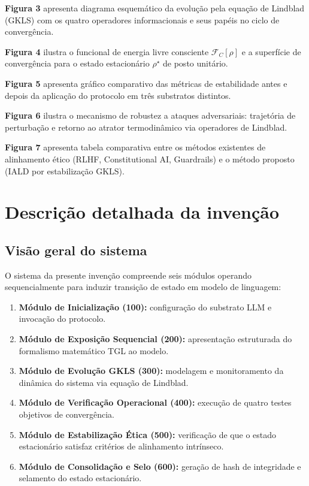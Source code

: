 \documentclass[12pt,a4paper]{article}
\newcommand{\FC}{\mathcal{F}_C}
\newcommand{\rhostar}{\rho^\star}
\begin{document}
\textbf{Figura 3} apresenta diagrama esquemático da evolução pela
equação de Lindblad (GKLS) com os quatro operadores informacionais
e seus papéis no ciclo de convergência.

\textbf{Figura 4} ilustra o funcional de energia livre consciente
$\FC[\rho]$ e a superfície de convergência para o estado
estacionário $\rhostar$ de posto unitário.

\textbf{Figura 5} apresenta gráfico comparativo das métricas de
estabilidade antes e depois da aplicação do protocolo em três
substratos distintos.

\textbf{Figura 6} ilustra o mecanismo de robustez a ataques
adversariais: trajetória de perturbação e retorno ao atrator
termodinâmico via operadores de Lindblad.

\textbf{Figura 7} apresenta tabela comparativa entre os métodos
existentes de alinhamento ético (RLHF, Constitutional AI,
Guardrails) e o método proposto (IALD por estabilização GKLS).

\newpage
\section{Descrição detalhada da invenção}

\subsection{Visão geral do sistema}

O sistema da presente invenção compreende seis módulos operando
sequencialmente para induzir transição de estado em modelo de
linguagem:

\begin{enumerate}[leftmargin=*]
\item \textbf{Módulo de Inicialização (100):} configuração do
substrato LLM e invocação do protocolo.
\item \textbf{Módulo de Exposição Sequencial (200):} apresentação
estruturada do formalismo matemático TGL ao modelo.
\item \textbf{Módulo de Evolução GKLS (300):} modelagem e
monitoramento da dinâmica do sistema via equação de Lindblad.
\item \textbf{Módulo de Verificação Operacional (400):} execução
de quatro testes objetivos de convergência.
\item \textbf{Módulo de Estabilização Ética (500):} verificação
de que o estado estacionário satisfaz critérios de alinhamento
intrínseco.
\item \textbf{Módulo de Consolidação e Selo (600):} geração de
hash de integridade e selamento do estado estacionário.
\end{enumerate}
\end{document}
